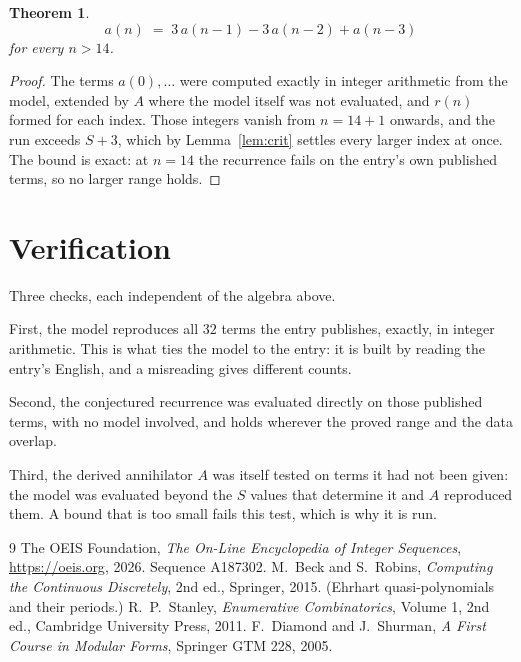 \documentclass[11pt,a4paper]{article}
\theoremstyle{plain}
\newtheorem{theorem}{Theorem}
\theoremstyle{definition}
\begin{document}
\begin{theorem}
\[
a(n)\;=\;3\,a(n-1) - 3\,a(n-2) + a(n-3)
\]
for every $n>14$.
\end{theorem}

\begin{proof}
The terms $a(0),\dots$ were computed exactly in integer arithmetic from the model, extended by
$A$ where the model itself was not evaluated, and $r(n)$ formed for each index. Those integers
vanish from $n=14+1$ onwards, and the run exceeds $S+3$, which by
Lemma~\ref{lem:crit} settles every larger index at once. The bound is exact: at $n=14$ the recurrence fails on the entry's own published terms, so no larger range holds.
\end{proof}

\section{Verification}

Three checks, each independent of the algebra above.

First, the model reproduces all $32$ terms the entry publishes, exactly, in integer
arithmetic. This is what ties the model to the entry: it is built by reading the entry's
English, and a misreading gives different counts.

Second, the conjectured recurrence was evaluated directly on those published terms, with no
model involved, and holds wherever the proved range and the data overlap.

Third, the derived annihilator $A$ was itself tested on terms it had not been given: the model
was evaluated beyond the $S$ values that determine it and $A$ reproduced them. A bound that is
too small fails this test, which is why it is run.

\begin{thebibliography}{9}
 The OEIS Foundation, \emph{The On-Line Encyclopedia of Integer
Sequences}, \url{https://oeis.org}, 2026. Sequence A187302.
 M.~Beck and S.~Robins, \emph{Computing the Continuous Discretely},
2nd ed., Springer, 2015. (Ehrhart quasi-polynomials and their periods.)
 R.~P.~Stanley, \emph{Enumerative Combinatorics}, Volume 1, 2nd ed.,
Cambridge University Press, 2011.
 F.~Diamond and J.~Shurman, \emph{A First Course in Modular Forms},
Springer GTM 228, 2005.
\end{thebibliography}
\end{document}
